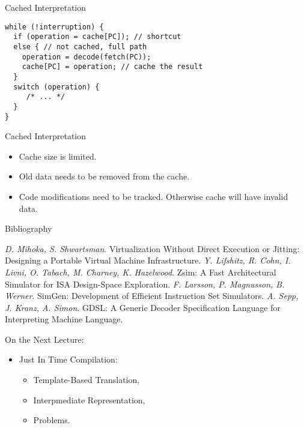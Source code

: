 \begin{frame}[fragile]{Cached Interpretation}
\begin{lstlisting}
while (!interruption) {
  if (operation = cache[PC]); // shortcut
  else { // not cached, full path
    operation = decode(fetch(PC));
    cache[PC] = operation; // cache the result
  }
  switch (operation) {
     /* ... */
  }
}
\end{lstlisting}
\end{frame}


\begin{frame}{Cached Interpretation}
\begin{itemize}
\item Cache size is limited.
\item Old data needs to be removed from the cache.
\item Code modifications need to be tracked. Otherwise cache will have invalid
  data.
\end{itemize}
\end{frame}

\begin{frame}[allowframebreaks]{Bibliography}
\begin{thebibliography}{99}
  \bibitem{} \textit{D. Mihoka, S. Shwartsman}. Virtualization Without Direct
    Execution or Jitting: Designing a Portable Virtual Machine Infrastructure.
  \bibitem{} \textit{Y. Lifshitz, R. Cohn, I. Livni, O. Tabach, M. Charney, K.
    Hazelwood}. Zsim: A Fast Architectural Simulator for ISA Design-Space
    Exploration.
  \bibitem{} \textit{F. Larsson, P. Magnusson, B. Werner}. SimGen: Development of
    Efficient Instruction Set Simulators.
  \bibitem{} \textit{A. Sepp, J. Kranz, A. Simon}. GDSL: A Generic Decoder
    Specification Language for Interpreting Machine Language.
\end{thebibliography}
\end{frame}

\begin{frame}{On the Next Lecture:}
\begin{itemize}
\item Just In Time Compilation:
\begin{itemize}
\item Template-Based Translation,
\item Interpmediate Representation,
\item Problems.
\end{itemize}
\end{itemize}
\end{frame}

\finalslide


